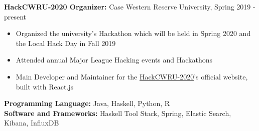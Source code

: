 \documentclass[a4paper,11pt]{article}
\begin{document}
\begin{flushleft}
	
	\textbf{HackCWRU-2020 Organizer: } Case Western Reserve University, Spring 2019 - 
	present
	\vspace{-\topsep}
	\begin{itemize}
		\setlength{\parskip}{0pt}
		\setlength{\itemsep}{0pt plus 1pt}
		\item Organized the university's Hackathon which will be held in Spring 2020 and the Local Hack Day in Fall 2019 \\
		\item Attended annual Major League Hacking events and Hackathons
		\item Main Developer and Maintainer for the \href{https://hackcwru.github.io/HackCWRU2020-Website/}{HackCWRU-2020}'s official website, built with React.js
	\end{itemize}
	
	\vspace{-\topsep}
	\centering{\noindent\makebox{\rule{8cm}{1.5pt}}}
\end{flushleft} 
\begin{flushleft}
	\textbf{Programming Language:} Java, Haskell, Python, R \\ 
	\doublespacing
	\textbf{Software and Frameworks:} Haskell Tool Stack, Spring, Elastic Search, Kibana, InfluxDB \\
	\vspace{-\topsep}
	
\end{flushleft}
\end{document}
